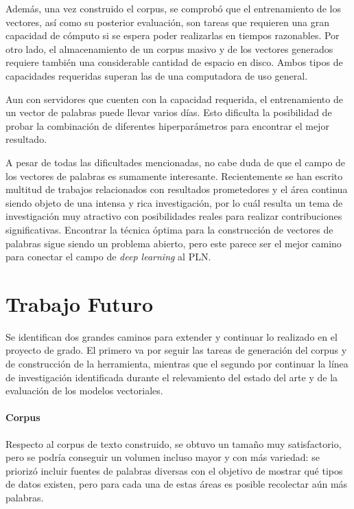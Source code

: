 Además, una vez construido el corpus, se comprobó que el entrenamiento de los vectores, así como su
posterior evaluación, son tareas que requieren una gran capacidad de cómputo si se espera poder
realizarlas en tiempos razonables. Por otro lado, el almacenamiento de un corpus masivo y de los
vectores generados requiere también una considerable cantidad de espacio en disco. Ambos tipos de
capacidades requeridas superan las de una computadora de uso general.

Aun con servidores que cuenten con la capacidad requerida, el entrenamiento de un vector de palabras
puede llevar varios días. Esto dificulta la posibilidad de probar la combinación de diferentes
hiperparámetros para encontrar el mejor resultado.

A pesar de todas las dificultades mencionadas, no cabe duda de que el campo de los vectores de palabras
es sumamente interesante. Recientemente se han escrito multitud de trabajos relacionados con resultados
prometedores y el área continua siendo objeto de una intensa y rica investigación, por lo cuál resulta un
tema de investigación muy atractivo con posibilidades reales para realizar contribuciones significativas.
Encontrar la técnica óptima para la construcción de vectores de palabras sigue siendo un problema abierto,
pero este parece ser el mejor camino para conectar el campo de \textit{deep learning} al PLN.


\section{Trabajo Futuro}

Se identifican dos grandes caminos para extender y continuar lo realizado en el proyecto de
grado. El primero va por seguir las tareas de generación del corpus y de construcción de la
herramienta, mientras que el segundo por continuar la línea de investigación identificada durante el
relevamiento del estado del arte y de la evaluación de los modelos vectoriales.


\paragraph{Corpus}

Respecto al corpus de texto construido, se obtuvo un tamaño muy satisfactorio, pero se podría
conseguir un volumen incluso mayor y con más variedad: se priorizó incluir fuentes de palabras
diversas con el objetivo de mostrar qué tipos de datos existen, pero para cada una de estas áreas es
posible recolectar aún más palabras.

